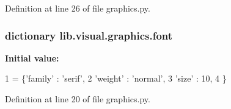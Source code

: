Definition at line 26 of file graphics.\-py.

\hypertarget{a00121_a3c83ccb4d4d1fcb0ea5f6b8616a1d0df}{
\subsubsection[{font}]{\setlength{\rightskip}{0pt plus 5cm}dictionary lib.\-visual.\-graphics.\-font}}\label{a00121_a3c83ccb4d4d1fcb0ea5f6b8616a1d0df}
{\bfseries Initial value\-:}
\begin{DoxyCode}
1 = \{\textcolor{stringliteral}{'family'} : \textcolor{stringliteral}{'serif'},
2         \textcolor{stringliteral}{'weight'} : \textcolor{stringliteral}{'normal'},
3         \textcolor{stringliteral}{'size'}   : 10,
4         \}
\end{DoxyCode}


Definition at line 20 of file graphics.\-py.

